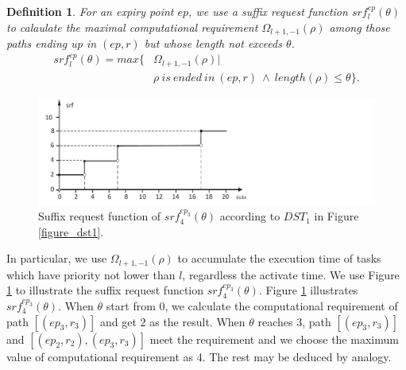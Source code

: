 \documentclass[10pt,conference]{IEEEtran}
\newtheorem{definition}{Definition}
\begin{document}
\begin{definition}
For an expiry point $ep$, we use a suffix request function $srf^{ep}_{l}(\theta)$ to calaulate the maximal computational requirement $\Omega_{l+1,-1}(\rho)$ among those paths ending up in $(ep,r)$ but whose length not exceeds $\theta$.
\begin{equation}
\begin{split}
srf^{ep}_l(\theta)=max\{&\Omega_{l+1,-1}(\rho)|\\&\rho\ is\ ended\ in\ (ep,r)\ \wedge\ length(\rho)\leq \theta\}.
\end{split}
\end{equation}\label{equation_srf}
\end{definition}
\begin{figure}[t]
  \centering
  \includegraphics[scale=0.547]{graphics/figure_srf-eps-converted-to.pdf}
  \caption{Suffix request function of $srf^{ep_3}_{4}(\theta)$ according to $DST_1$ in Figure \ref{figure_dst1}.} 
  \label{figure_srf}
\end{figure}

In particular, we use $\Omega_{l+1,-1}(\rho)$ to accumulate the execution time of tasks which have priority not lower than $l$, regardless the activate time. We use Figure \ref{figure_srf} to illustrate the suffix request function $srf^{ep_3}_{4}(\theta)$. Figure \ref{figure_srf} illustrates $srf^{ep_3}_{4}(\theta)$. When $\theta$ start from 0, we calculate the computational requirement of path $[(ep_3,r_3)]$ and get $2$ as the result. When $\theta$ reaches 3, path $[(ep_3,r_3)]$ and $[(ep_2,r_2),(ep_3,r_3)]$ meet the requirement and we choose the maximum value of computational requirement as 4. The rest may be deduced by analogy.

\end{document}
